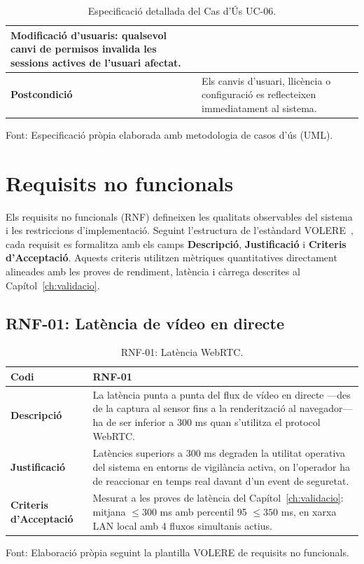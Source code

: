\begin{table}[htbp]
\begin{tabular}{|l|p{10cm}|}
    Modificació d'usuaris: qualsevol canvi de permisos invalida les sessions actives de l'usuari afectat.                        \\ \hline
    \textbf{Postcondició}                   & Els canvis d'usuari, llicència o configuració es reflecteixen immediatament al sistema.                                        \\ \hline
  \end{tabular}
  \caption{Especificació detallada del Cas d'Ús UC-06.}
  \label{tab:uc_admin}
\par\smallskip
\small Font: Especificació pròpia elaborada amb metodologia de casos d'ús (UML).
\end{table}

\section{Requisits no funcionals}
\label{sec:rnf}
Els requisits no funcionals (RNF) defineixen les qualitats observables del sistema i les restriccions d'implementació. Seguint l'estructura de l'estàndard VOLERE~\cite{volere_robertson}, cada requisit es formalitza amb els camps \textbf{Descripció}, \textbf{Justificació} i \textbf{Criteris d'Acceptació}. Aquests criteris utilitzen mètriques quantitatives directament alineades amb les proves de rendiment, latència i càrrega descrites al Capítol~\ref{ch:validacio}.

\subsection{RNF-01: Latència de vídeo en directe}
\begin{table}[htbp]
  \centering
  \small
  \begin{tabular}{|l|p{10cm}|}
    \hline
    \textbf{Codi}                    & RNF-01 \\ \hline
    \textbf{Descripció}              & La latència punta a punta del flux de vídeo en directe ---des de la captura al sensor fins a la renderització al navegador--- ha de ser inferior a 300 ms quan s'utilitza el protocol WebRTC. \\ \hline
    \textbf{Justificació}            & Latències superiors a 300 ms degraden la utilitat operativa del sistema en entorns de vigilància activa, on l'operador ha de reaccionar en temps real davant d'un event de seguretat. \\ \hline
    \textbf{Criteris d'Acceptació}   & Mesurat a les proves de latència del Capítol~\ref{ch:validacio}: mitjana $\leq 300$ ms amb percentil 95 $\leq 350$ ms, en xarxa LAN local amb 4 fluxos simultanis actius. \\ \hline
  \end{tabular}
  \caption{RNF-01: Latència WebRTC.}
  \label{tab:rnf01}
\par\smallskip
\small Font: Elaboració pròpia seguint la plantilla VOLERE de requisits no funcionals.
\end{table}

